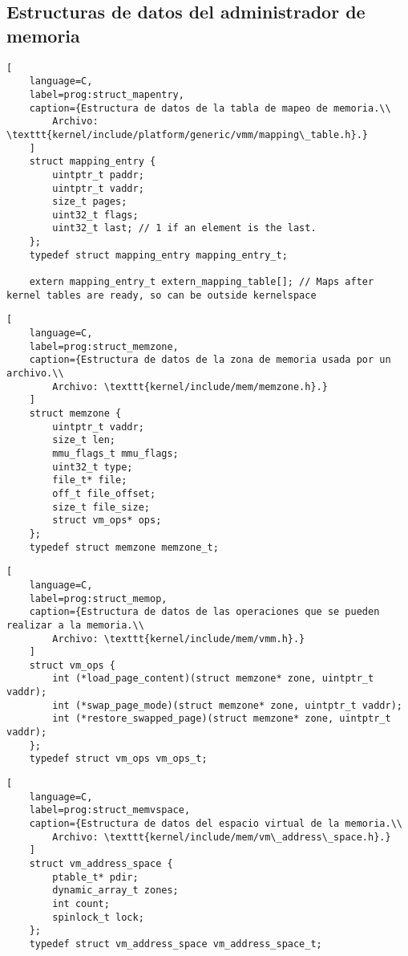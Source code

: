 \newpage
\subsection{Estructuras de datos del administrador de memoria}
\begin{lstlisting}[
	language=C,
	label=prog:struct_mapentry,
	caption={Estructura de datos de la tabla de mapeo de memoria.\\
		Archivo: \texttt{kernel/include/platform/generic/vmm/mapping\_table.h}.}
	]
	struct mapping_entry {
		uintptr_t paddr;
		uintptr_t vaddr;
		size_t pages;
		uint32_t flags;
		uint32_t last; // 1 if an element is the last.
	};
	typedef struct mapping_entry mapping_entry_t;
	
	extern mapping_entry_t extern_mapping_table[]; // Maps after kernel tables are ready, so can be outside kernelspace
\end{lstlisting}

\begin{lstlisting}[
	language=C,
	label=prog:struct_memzone,
	caption={Estructura de datos de la zona de memoria usada por un archivo.\\
		Archivo: \texttt{kernel/include/mem/memzone.h}.}
	]
	struct memzone {
		uintptr_t vaddr;
		size_t len;
		mmu_flags_t mmu_flags;
		uint32_t type;
		file_t* file;
		off_t file_offset;
		size_t file_size;
		struct vm_ops* ops;
	};
	typedef struct memzone memzone_t;
\end{lstlisting}

\begin{lstlisting}[
	language=C,
	label=prog:struct_memop,
	caption={Estructura de datos de las operaciones que se pueden realizar a la memoria.\\
		Archivo: \texttt{kernel/include/mem/vmm.h}.}
	]
	struct vm_ops {
		int (*load_page_content)(struct memzone* zone, uintptr_t vaddr);
		int (*swap_page_mode)(struct memzone* zone, uintptr_t vaddr);
		int (*restore_swapped_page)(struct memzone* zone, uintptr_t vaddr);
	};
	typedef struct vm_ops vm_ops_t;
\end{lstlisting}

\begin{lstlisting}[
	language=C,
	label=prog:struct_memvspace,
	caption={Estructura de datos del espacio virtual de la memoria.\\
		Archivo: \texttt{kernel/include/mem/vm\_address\_space.h}.}
	]
	struct vm_address_space {
		ptable_t* pdir;
		dynamic_array_t zones;
		int count;
		spinlock_t lock;
	};
	typedef struct vm_address_space vm_address_space_t;
\end{lstlisting}

